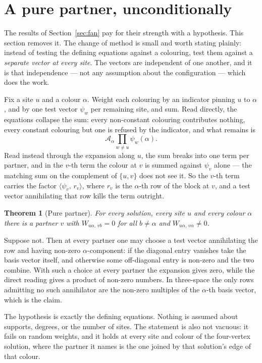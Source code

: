 \documentclass[11pt]{article}
\newtheorem{theorem}{Theorem}[section]
\theoremstyle{definition}
\theoremstyle{remark}
\begin{document}
\section{A pure partner, unconditionally}\label{sec:pure}

The results of Section~\ref{sec:fan} pay for their strength with a hypothesis. This
section removes it. The change of method is small and worth stating plainly: instead of
testing the defining equations against a colouring, test them against a \emph{separate
vector at every site}. The vectors are independent of one another, and it is that
independence --- not any assumption about the configuration --- which does the work.

Fix a site $u$ and a colour $\alpha$. Weight each colouring by an indicator pinning $u$
to $\alpha$, and by one test vector $\psi_w$ per remaining site, and sum. Read directly,
the equations collapse the sum: every non-constant colouring contributes nothing, every
constant colouring but one is refused by the indicator, and what remains is
\[
  \mathcal{A}_\alpha \prod_{w \neq u} \psi_w(\alpha).
\]
Read instead through the expansion along $u$, the sum breaks into one term per partner,
and in the $v$-th term the colour at $v$ is summed against $\psi_v$ alone --- the
matching sum on the complement of $\{u,v\}$ does not see it. So the $v$-th term carries
the factor $\langle \psi_v,\, r_v\rangle$, where $r_v$ is the $\alpha$-th row of the
block at $v$, and a test vector annihilating that row kills the term outright.

\begin{theorem}[Pure partner]\label{thm:pure}
For every solution, every site $u$ and every colour $\alpha$ there is a partner $v$ with
$W_{u\alpha,\,vb} = 0$ for all $b \neq \alpha$ and $W_{u\alpha,\,v\alpha} \neq 0$.
\end{theorem}

Suppose not. Then at every partner one may choose a test vector annihilating the row and
having non-zero $\alpha$-component: if the diagonal entry vanishes take the basis vector
itself, and otherwise some off-diagonal entry is non-zero and the two combine. With such
a choice at every partner the expansion gives zero, while the direct reading gives a
product of non-zero numbers. In three-space the only rows admitting no such annihilator
are the non-zero multiples of the $\alpha$-th basis vector, which is the claim.

The hypothesis is exactly the defining equations. Nothing is assumed about supports,
degrees, or the number of sites. The statement is also not vacuous: it fails on random
weights, and it holds at every site and colour of the four-vertex solution, where the
partner it names is the one joined by that solution's edge of that colour.
\end{document}
